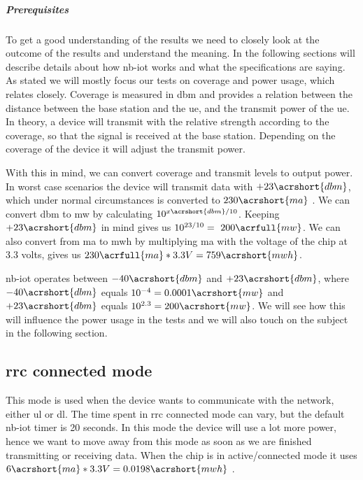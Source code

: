 \documentclass[USenglish]{ifimaster}  %
\begin{document}
\subparagraph{Prerequisites}
To get a good understanding of the results we need to closely look at the outcome of the results and understand the meaning. In the following sections will describe details about how \acrshort{nb-iot} works and what the specifications are saying. As stated we will mostly focus our tests on coverage and power usage, which relates closely. Coverage is measured in \acrfull{dbm} and provides a relation between the distance between the base station and the \acrshort{ue}, and the transmit power of the \acrshort{ue}. In theory, a device will transmit with the relative strength according to the coverage, so that the signal is received at the base station. Depending on the coverage of the device it will adjust the transmit power.

With this in mind, we can convert coverage and transmit levels to output power. In worst case scenarios the device will transmit data with ${+23\acrshort{dbm}}$, which under normal circumstances is converted to ${230 \acrshort{ma}}$ \cite{datasheet:ubloxchip}. We can convert \acrshort{dbm} to \acrshort{mw} by calculating ${10^{x \acrshort{dbm} / 10}}$. Keeping ${+23 \acrshort{dbm}}$ in mind gives us ${10^{23 / 10} = ~200 \acrfull{mw}}$. We can also convert from \acrshort{ma} to \acrshort{mwh} by multiplying \acrshort{ma} with the voltage of the chip at 3.3 volts, gives us ${230\acrfull{ma} * 3.3V = 759 \acrshort{mwh}}$.

\acrshort{nb-iot} operates between ${-40 \acrshort{dbm}}$ and ${+23 \acrshort{dbm}}$, where ${-40 \acrshort{dbm}}$ equals ${10^{-4} = 0.0001 \acrshort{mw}}$ and ${+23 \acrshort{dbm}}$ equals ${10^{2.3} = 200 \acrshort{mw}}$. We will see how this will influence the power usage in the tests and we will also touch on the subject in the following section.

\subsection{\acrshort{rrc} connected mode} \label{ssection:rrc}
This mode is used when the device wants to communicate with the network, either \acrshort{ul} or \acrshort{dl}. The time spent in \acrshort{rrc} connected mode can vary, but the default \acrshort{nb-iot} timer is 20 seconds. In this mode the device will use a lot more power, hence we want to move away from this mode as soon as we are finished transmitting or receiving data. When the chip is in active/connected mode it uses ${6 \acrshort{ma} * 3.3V = 0.0198 \acrshort{mwh}}$ \cite{datasheet:ubloxchip}.
\end{document}
